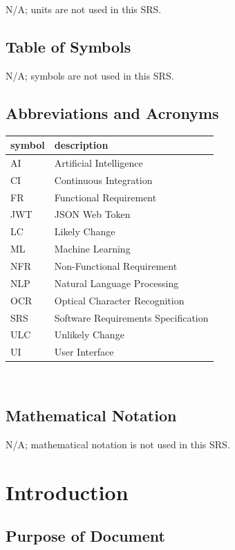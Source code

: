 \documentclass[12pt]{article}
\begin{document}
N/A; units are not used in this SRS.

\subsection{Table of Symbols}

N/A; symbols are not used in this SRS.

\subsection{Abbreviations and Acronyms}

\renewcommand{\arraystretch}{1.2}
\begin{tabular}{l l} 
  \toprule		
  \textbf{symbol} & \textbf{description}\\
  \midrule 
  AI & Artificial Intelligence\\
  CI & Continuous Integration\\
  FR & Functional Requirement\\
  JWT & JSON Web Token\\
  LC & Likely Change\\
  ML & Machine Learning\\
  NFR & Non-Functional Requirement\\
  NLP & Natural Language Processing\\
  OCR & Optical Character Recognition\\
  SRS & Software Requirements Specification\\
  ULC & Unlikely Change\\
  UI & User Interface\\
  \bottomrule
\end{tabular}\\

\subsection{Mathematical Notation}

N/A; mathematical notation is not used in this SRS.

\newpage


\section{Introduction}


\subsection{Purpose of Document}
\end{document}
